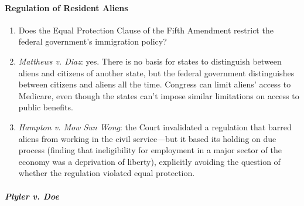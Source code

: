 \paragraph{Regulation of Resident Aliens}

\begin{enumerate}
    \item Does the Equal Protection Clause of the Fifth Amendment restrict the 
    federal government's immigration policy?
    \item \emph{Matthews v. Diaz}: yes. There is no basis for states to 
    distinguish between aliens and citizens of another state, but the federal 
    government distinguishes between citizens and aliens all the time. 
    Congress can limit aliens' access to Medicare, even though the states 
    can't impose similar limitations on access to public benefits.  
    \item \emph{Hampton v. Mow Sun Wong}: the Court invalidated a regulation 
    that barred aliens from working in the civil service---but it based its 
    holding on due process (finding that ineligibility for employment in a 
    major sector of the economy was a deprivation of liberty), explicitly 
    avoiding the question of whether the regulation violated equal protection.
\end{enumerate}

\paragraph{\emph{Plyler v. Doe}}
 
